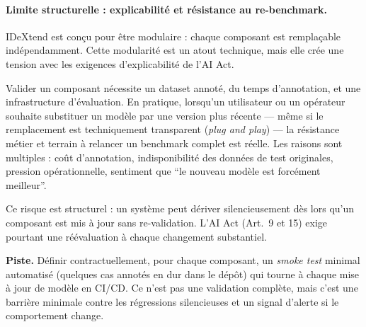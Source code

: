 \documentclass[11pt,a4paper]{report}
\begin{document}
\paragraph{Limite structurelle : explicabilité et résistance au re-benchmark.}

IDeXtend est conçu pour être modulaire : chaque composant est remplaçable
indépendamment. Cette modularité est un atout technique, mais elle crée une
tension avec les exigences d'explicabilité de l'AI Act.

Valider un composant nécessite un dataset annoté, du temps d'annotation, et
une infrastructure d'évaluation. En pratique, lorsqu'un utilisateur ou un
opérateur souhaite substituer un modèle par une version plus récente --- même
si le remplacement est techniquement transparent (\textit{plug and play}) ---
la résistance métier et terrain à relancer un benchmark complet est réelle.
Les raisons sont multiples : coût d'annotation, indisponibilité des données
de test originales, pression opérationnelle, sentiment que ``le nouveau modèle
est forcément meilleur''.

Ce risque est structurel : un système peut dériver silencieusement dès lors
qu'un composant est mis à jour sans re-validation. L'AI Act (Art.~9 et 15)
exige pourtant une réévaluation à chaque changement substantiel.

\textbf{Piste.} Définir contractuellement, pour chaque composant, un
\textit{smoke test} minimal automatisé (quelques cas annotés en dur dans
le dépôt) qui tourne à chaque mise à jour de modèle en CI/CD. Ce n'est pas
une validation complète, mais c'est une barrière minimale contre les
régressions silencieuses et un signal d'alerte si le comportement change.



\end{document}
